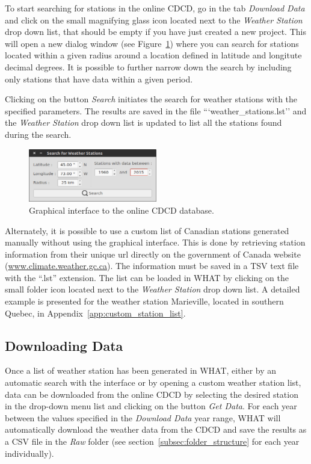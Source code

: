 \documentclass[WHATMANUAL.tex]{subfiles}
\begin{document}
To start searching for stations in the online CDCD, go in the tab \emph{Download Data} and click on the small magnifying glass icon located next to the \emph{Weather Station} drop down list, that should be empty if you have just created a new project. This will open a new dialog window (see Figure~\ref{fig:Screenshot_search4stations}) where you can search for stations located within a given radius around a location defined in latitude and longitute decimal degrees. It is possible to further narrow down the search by including only stations that have data within a given period. 

Clicking on the button \emph{Search} initiates the search for weather stations with the specified parameters. The results are saved in the file ```weather\_stations.lst'' and the \emph{Weather Station} drop down list is updated to list all the stations found during the search.

\begin{figure}[h]
\centering
\includegraphics[width=0.5\textwidth]{img/WHAT_Screenshot_search4stations}
\caption[Graphical interface to the online CDCD database.]{Graphical interface to the online CDCD database.}
\label{fig:Screenshot_search4stations}
\end{figure}

Alternately, it is possible to use a custom list of Canadian stations generated manually without using the graphical interface. This is done by retrieving station information from their unique url directly on the government of Canada website (\url{www.climate.weather.gc.ca}). The information must be saved in a TSV text file with the ``.lst'' extension. The list can be loaded in WHAT by clicking on the small folder icon located next to the \emph{Weather Station} drop down list. A detailed example is presented for the weather station Marieville, located in southern Quebec, in Appendix~\ref{app:custom_station_list}.

\subsection{Downloading Data}

Once a list of weather station has been generated in WHAT, either by an automatic search with the interface or by opening a custom weather station list, data can be downloaded from the online CDCD by selecting the desired station in the drop-down menu list and clicking on the button \emph{Get Data}. For each year between the values specified in the \emph{Download Data} year range, WHAT will automatically download the weather data from the CDCD and save the results as a CSV file in the \emph{Raw} folder (see section~\ref{subsec:folder_structure} for each year individually).
\end{document}

